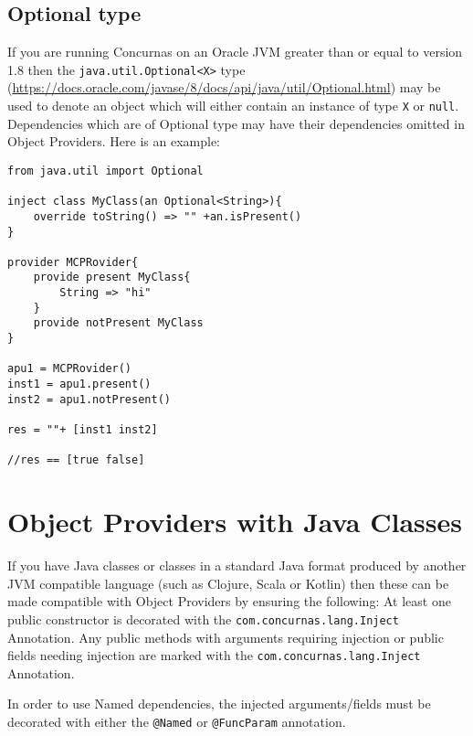 \documentclass[conc-doc]{subfiles}
\begin{document}
\subsection{Optional type}
If you are running Concurnas on an Oracle JVM greater than or equal to version 1.8 then the \lstinline{java.util.Optional<X>} type (\href{https://docs.oracle.com/javase/8/docs/api/java/util/Optional.html}{https://docs.oracle.com/javase/8/docs/api/java/util/Optional.html}) may be used to denote an object which will either contain an instance of type \lstinline{X} or \lstinline{null}. Dependencies which are of Optional type may have their dependencies omitted in Object Providers. Here is an example:



\begin{lstlisting}
from java.util import Optional

inject class MyClass(an Optional<String>){
	override toString() => "" +an.isPresent()
}

provider MCPRovider{
	provide present MyClass{
		String => "hi"
	}
	provide notPresent MyClass
}

apu1 = MCPRovider()
inst1 = apu1.present()
inst2 = apu1.notPresent()

res = ""+ [inst1 inst2]

//res == [true false]
\end{lstlisting}

\section{Object Providers with Java Classes}
If you have Java classes or classes in a standard Java format produced by another JVM compatible language (such as Clojure, Scala or Kotlin) then these can be made compatible with Object Providers by ensuring the following:
At least one public constructor is decorated with the \lstinline{com.concurnas.lang.Inject} Annotation.
Any public methods with arguments requiring injection or public fields needing injection are marked with the \lstinline{com.concurnas.lang.Inject} Annotation.

In order to use Named dependencies, the injected arguments/fields must be decorated with either the \lstinline{@Named} or \lstinline{@FuncParam} annotation.
\end{document}
